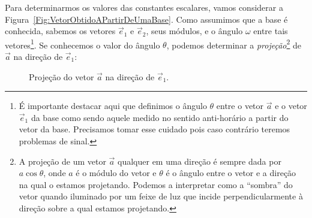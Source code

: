 Para determinarmos os valores das constantes escalares, vamos considerar a Figura~\ref{Fig:VetorObtidoAPartirDeUmaBase}. Como assumimos que a base é conhecida, sabemos os vetores $\vec{e}_1$ e $\vec{e}_2$, seus módulos, e o ângulo $\omega$ entre tais vetores\footnote[][-13mm]{É importante destacar aqui que definimos o ângulo $\theta$ entre o vetor $\vec{a}$ e o vetor $\vec{e}_1$ da base como sendo aquele medido no sentido anti-horário a partir do vetor da base. Precisamos tomar esse cuidado pois caso contrário teremos problemas de sinal.}. Se conhecemos o valor do ângulo $\theta$, podemos determinar a \emph{projeção}\footnote[][4cm]{A projeção de um vetor $\vec{a}$ qualquer em uma direção é sempre dada por $a\cos\theta$, onde $a$ é o módulo do vetor e $\theta$ é o ângulo entre o vetor e a direção na qual o estamos projetando. Podemos a interpretar como a ``sombra'' do vetor quando iluminado por um feixe de luz que incide perpendicularmente à direção sobre a qual estamos projetando.} de $\vec{a}$ na direção de $\vec{e}_1$:
\begin{figure}[!h]
\centering
{}
\caption{Projeção do vetor $\vec{a}$ na direção de $\vec{e}_1$.}
\end{figure}

